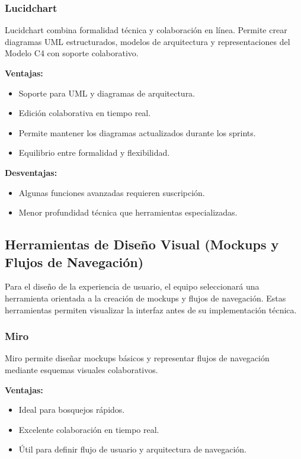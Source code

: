\documentclass[12pt]{article}
\begin{document}
\subsubsection{Lucidchart}

Lucidchart combina formalidad técnica y colaboración en línea. Permite crear diagramas UML estructurados, modelos de arquitectura y representaciones del Modelo C4 con soporte colaborativo.

\textbf{Ventajas:}
\begin{itemize}
    \item Soporte para UML y diagramas de arquitectura.
    \item Edición colaborativa en tiempo real.
    \item Permite mantener los diagramas actualizados durante los sprints.
    \item Equilibrio entre formalidad y flexibilidad.
\end{itemize}

\textbf{Desventajas:}
\begin{itemize}
    \item Algunas funciones avanzadas requieren suscripción.
    \item Menor profundidad técnica que herramientas especializadas.
\end{itemize}

\subsection{Herramientas de Diseño Visual (Mockups y Flujos de Navegación)}

Para el diseño de la experiencia de usuario, el equipo seleccionará una herramienta orientada a la creación de mockups y flujos de navegación. Estas herramientas permiten visualizar la interfaz antes de su implementación técnica.

\subsubsection{Miro}

Miro permite diseñar mockups básicos y representar flujos de navegación mediante esquemas visuales colaborativos.

\textbf{Ventajas:}
\begin{itemize}
    \item Ideal para bosquejos rápidos.
    \item Excelente colaboración en tiempo real.
    \item Útil para definir flujo de usuario y arquitectura de navegación.
\end{itemize}
\end{document}
